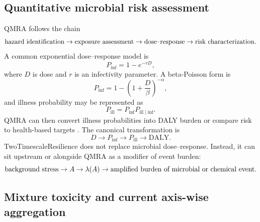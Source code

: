 \subsection{Quantitative microbial risk assessment}

QMRA follows the chain
\begin{equation}
  \hbox{hazard identification}\rightarrow\hbox{exposure assessment}\rightarrow\hbox{dose--response}\rightarrow\hbox{risk characterization}.
\end{equation}
A common exponential dose--response model is
\begin{equation}
  P_{\mathrm{inf}}=1-e^{-rD},
\end{equation}
where $D$ is dose and $r$ is an infectivity parameter. A beta-Poisson form is
\begin{equation}
  P_{\mathrm{inf}}=1-\left(1+\frac{D}{\beta}\right)^{-\alpha},
\end{equation}
and illness probability may be represented as
\begin{equation}
  P_{\mathrm{ill}}=P_{\mathrm{inf}}P_{\mathrm{ill}\mid\mathrm{inf}}.
\end{equation}
QMRA can then convert illness probabilities into DALY burden or compare risk to health-based targets \citep{who2016qmra,healthcanada2019qmra}. The canonical transformation is
\begin{equation}
  D\rightarrow P_{\mathrm{inf}}\rightarrow P_{\mathrm{ill}}\rightarrow \mathrm{DALY}.
\end{equation}
TwoTimescaleResilience does not replace microbial dose--response. Instead, it can sit upstream or alongside QMRA as a modifier of event burden:
\begin{equation}
  \hbox{background stress}\rightarrow A\rightarrow\lambda(A)\rightarrow \hbox{amplified burden of microbial or chemical event}.
\end{equation}

\subsection{Mixture toxicity and current axis-wise aggregation}

